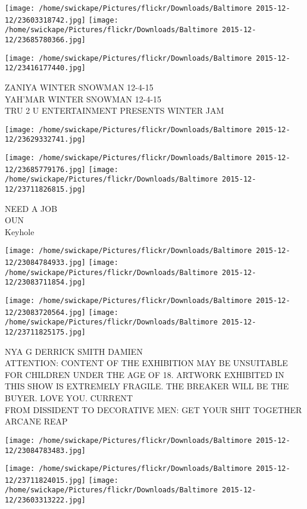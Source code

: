 \documentclass[10pt,letterpaper]{article}
\begin{document}
\texttt{[image: /home/swickape/Pictures/flickr/Downloads/Baltimore 2015-12-12/23603318742.jpg]}
\texttt{[image: /home/swickape/Pictures/flickr/Downloads/Baltimore 2015-12-12/23685780366.jpg]}

\texttt{[image: /home/swickape/Pictures/flickr/Downloads/Baltimore 2015-12-12/23416177440.jpg]}

ZANIYA WINTER SNOWMAN 12{-}4{-}15\\
YAH'MAR WINTER SNOWMAN 12{-}4{-}15\\
TRU 2 U ENTERTAINMENT PRESENTS WINTER JAM\\
\pagebreak

\texttt{[image: /home/swickape/Pictures/flickr/Downloads/Baltimore 2015-12-12/23629332741.jpg]}

\vspace{0.25in}
\texttt{[image: /home/swickape/Pictures/flickr/Downloads/Baltimore 2015-12-12/23685779176.jpg]}
\texttt{[image: /home/swickape/Pictures/flickr/Downloads/Baltimore 2015-12-12/23711826815.jpg]}

NEED A JOB\\
OUN\\
Keyhole\\
\pagebreak

\texttt{[image: /home/swickape/Pictures/flickr/Downloads/Baltimore 2015-12-12/23084784933.jpg]}
\texttt{[image: /home/swickape/Pictures/flickr/Downloads/Baltimore 2015-12-12/23083711854.jpg]}

\texttt{[image: /home/swickape/Pictures/flickr/Downloads/Baltimore 2015-12-12/23083720564.jpg]}
\texttt{[image: /home/swickape/Pictures/flickr/Downloads/Baltimore 2015-12-12/23711825175.jpg]}

NYA G DERRICK SMITH DAMIEN\\
ATTENTION: CONTENT OF THE EXHIBITION MAY BE UNSUITABLE FOR CHILDREN UNDER THE AGE OF 18.  ARTWORK EXHIBITED IN THIS SHOW IS EXTREMELY FRAGILE.  THE BREAKER WILL BE THE BUYER.  LOVE YOU.  CURRENT\\
FROM DISSIDENT TO DECORATIVE MEN: GET YOUR SHIT TOGETHER\\
ARCANE REAP\\
\pagebreak

\texttt{[image: /home/swickape/Pictures/flickr/Downloads/Baltimore 2015-12-12/23084783483.jpg]}

\vspace{0.25in}
\texttt{[image: /home/swickape/Pictures/flickr/Downloads/Baltimore 2015-12-12/23711824015.jpg]}
\texttt{[image: /home/swickape/Pictures/flickr/Downloads/Baltimore 2015-12-12/23603313222.jpg]}
\end{document}
